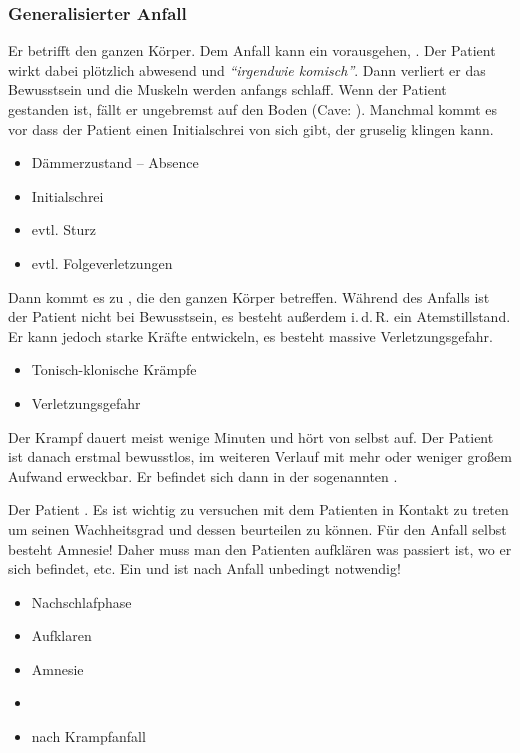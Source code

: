\subsubsection{Generalisierter Anfall}
\label{topic:krampfanfall-generalisierter}

{%
Er betrifft den ganzen Körper. Dem Anfall kann ein
vorausgehen, . Der Patient wirkt
dabei plötzlich abwesend und \emph{"`irgendwie komisch"'}.
Dann verliert er das Bewusstsein und die Muskeln werden
anfangs schlaff. Wenn der Patient gestanden ist, fällt er
ungebremst auf den Boden (Cave: ).
Manchmal kommt es vor dass der Patient einen
Initialschrei von sich gibt, der
gruselig klingen kann. 
}{
\begin{itemize}
  \item Dämmerzustand -- Absence
  \item Initialschrei
  \item evtl. Sturz
  \item evtl. Folgeverletzungen
\end{itemize}

}{}{}{}

{%
Dann kommt es zu
,
die den ganzen Körper betreffen. Während des Anfalls ist der
Patient nicht bei Bewusstsein, es besteht außerdem i.\,d.\,R.
ein Atemstillstand. Er kann jedoch starke Kräfte entwickeln, es
besteht massive
Verletzungsgefahr.
}{
\begin{itemize}
  \item Tonisch-klonische Krämpfe
  \item Verletzungsgefahr
\end{itemize}
}{}{}{}


{%
Der Krampf dauert meist wenige Minuten und hört von selbst
auf. Der Patient ist danach erstmal bewusstlos, im weiteren
Verlauf mit mehr oder weniger großem Aufwand erweckbar. Er
befindet sich dann in der sogenannten
.

Der Patient . Es ist
wichtig zu versuchen mit dem Patienten in Kontakt zu treten
um seinen Wachheitsgrad und dessen
 beurteilen zu können. Für den Anfall selbst besteht
Amnesie! Daher muss man den Patienten aufklären was passiert
ist, wo er sich befindet, etc. Ein  und
 ist nach \underline{} Anfall
unbedingt notwendig! 
}{
\begin{itemize}
  \item Nachschlafphase
  \item Aufklaren
  \item Amnesie
  \item {}
  \item {} nach \underline{} Krampfanfall
\end{itemize}
}{}{}{}



